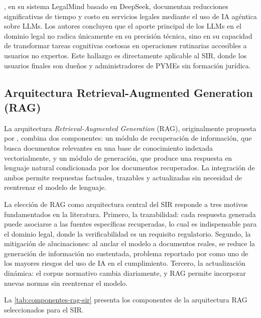 \documentclass[12pt,a4paper,oneside]{report}
\begin{document}
\textcite{raju2025}, en su sistema LegalMind basado en DeepSeek, documentan reducciones significativas de tiempo y costo en servicios legales mediante el uso de IA agéntica sobre LLMs. Los autores concluyen que el aporte principal de los LLMs en el dominio legal no radica únicamente en su precisión técnica, sino en su capacidad de transformar tareas cognitivas costosas en operaciones rutinarias accesibles a usuarios no expertos. Este hallazgo es directamente aplicable al SIR, donde los usuarios finales son dueños y administradores de PYMEs sin formación jurídica.

\subsection{Arquitectura Retrieval-Augmented Generation (RAG)}\label{subsec:arquitectura-rag}

La arquitectura \textit{Retrieval-Augmented Generation} (RAG), originalmente propuesta por \textcite{lewis2020}, combina dos componentes: un módulo de recuperación de información, que busca documentos relevantes en una base de conocimiento indexada vectorialmente, y un módulo de generación, que produce una respuesta en lenguaje natural condicionada por los documentos recuperados. La integración de ambos permite respuestas factuales, trazables y actualizadas sin necesidad de reentrenar el modelo de lenguaje.

La elección de RAG como arquitectura central del SIR responde a tres motivos fundamentados en la literatura. Primero, la trazabilidad: cada respuesta generada puede asociarse a las fuentes específicas recuperadas, lo cual es indispensable para el dominio legal, donde la verificabilidad es un requisito regulatorio. Segundo, la mitigación de alucinaciones: al anclar el modelo a documentos reales, se reduce la generación de información no sustentada, problema reportado por \textcite{siering2022} como uno de los mayores riesgos del uso de IA en el cumplimiento. Tercero, la actualización dinámica: el corpus normativo cambia diariamente, y RAG permite incorporar nuevas normas sin reentrenar el modelo.

La \cref{tab:componentes-rag-sir} presenta los componentes de la arquitectura RAG seleccionados para el SIR.
\end{document}
